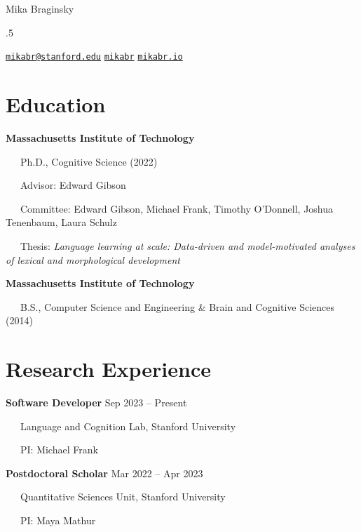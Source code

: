\documentclass[11pt,]{article}
\begin{document}
\centerline{\huge Mika Braginsky}

\vspace{1.5 mm}

\footnotesize


\moveleft.5\hoffset\centerline{
      \scalebox{1.2}{\faEnvelope}\hspace{.5 mm}
    \href{mailto:}{\tt \href{mailto:mikabr@stanford.edu}{\nolinkurl{mikabr@stanford.edu}}} \hspace{2 mm}
        \scalebox{1.4}{\faGithub}\hspace{.5 mm}
    \href{http://github.com/mikabr}{\tt mikabr} \hspace{2 mm}
        \scalebox{1.2}{\faLink}\hspace{.5 mm}
    \href{http://mikabr.io}{\tt mikabr.io} \hspace{2 mm}
    }
\normalsize

\section{Education}\label{education}

\textbf{Massachusetts Institute of Technology}\\
\strut ~~~Ph.D., Cognitive Science (2022)\\
\strut ~~~Advisor: Edward Gibson\\
\strut ~~~Committee: Edward Gibson, Michael Frank, Timothy O'Donnell,
Joshua Tenenbaum, Laura Schulz\\
\strut ~~~Thesis: \emph{Language learning at scale: Data-driven and
model-motivated analyses of lexical and morphological development}

\textbf{Massachusetts Institute of Technology}\\
\strut ~~~B.S., Computer Science and Engineering \& Brain and Cognitive
Sciences (2014)

\section{Research Experience}\label{research-experience}

\textbf{Software Developer} \hfill Sep 2023 -- Present\\
\strut ~~~Language and Cognition Lab, Stanford University\\
\strut ~~~PI: Michael Frank

\textbf{Postdoctoral Scholar} \hfill Mar 2022 -- Apr 2023\\
\strut ~~~Quantitative Sciences Unit, Stanford University\\
\strut ~~~PI: Maya Mathur
\end{document}
